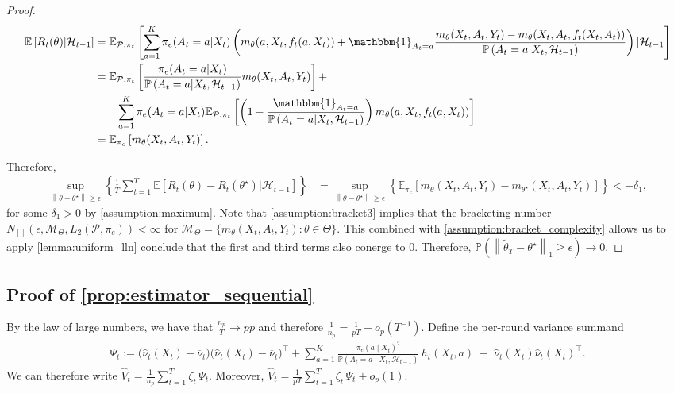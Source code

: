 \documentclass[11pt]{article}
\newcommand{\E}{\mathbb{E}}
\newcommand{\norm}[1]{\left\lVert#1\right\rVert}
\begin{document}
\begin{appendix}
\begin{proof}
\begin{align*}
    \E\left[R_{t}(\theta)| \mathcal{H}_{t-1} \right] &=  \E_{\mathcal{P},\pi_{t}}\left[\sum_{a=1}^{K} \pi_{e}(A_{t} =a | X_{t}) \left( m_{\theta}(a,X_{t},f_{t}(a,X_{t}))   + \mathbbm{1}_{A_{t} = a} \frac{ m_{\theta}(X_{t},A_{t},Y_{t})  -  m_{\theta}(X_{t},A_{t},f_{t}(X_{t},A_{t})) }{ \mathbb{P} \left(A_{t} =a | X_{t},\mathcal{H}_{t-1} \right)  }\right) |\mathcal{H}_{t-1}\right] \\
    &= \E_{\mathcal{P},\pi_{t}}\left[\frac{ \pi_{e}(A_{t} =a | X_{t})}{\mathbb{P} \left(A_{t} =a | X_{t},\mathcal{H}_{t-1} \right)} m_{\theta}(X_{t},A_{t},Y_{t}) \right ] + \\
    &\qquad \sum_{a =1}^{K}\pi_{e}(A_{t} =a | X_{t}) \E_{\mathcal{P},\pi_{t}} \left[ 
    \left( 1 - \frac{ \mathbbm{1}_{A_t=a}  }{  \mathbb{P} \left(A_{t}=a| X_{t}, \mathcal{H}_{t-1} \right)} \right)m_{\theta}(a,X_{t},f_{t}(a,X_{t}))  \right] \\
    &= \E_{\pi_{e} }\left[ m_{\theta}(X_{t},A_{t},Y_{t}) \right ]. 
\end{align*}

Therefore,
\begin{align*}
\sup_{\norm{\theta- \theta^{\star}} \ge \epsilon} \left\{ \frac{1}{T} \sum_{t=1}^{T} \mathbb{E}\left[ R_{t}(\theta) - R_{t}(\theta^{\star})| \mathcal{H}_{t-1} \right]  \right\} &= \sup_{\norm{\theta- \theta^{\star}} \ge \epsilon} \left\{\mathbb{E}_{\pi_{e}}\left[ m_{\theta}(X_{t},A_{t},Y_{t}) - m_{\theta^{\star}}(X_{t},A_{t},Y_{t})\right]  \right\} < - \delta_{1}, 
\end{align*}
for some $\delta_1 > 0$ by \cref{assumption:maximum}. Note that \cref{assumption:bracket3} implies that the bracketing number $N_{[]}(\epsilon, \mathcal{M}_{\Theta}, L_{2}(\mathcal{P},\pi_{e})) < \infty$ for $ \mathcal{M}_{\Theta} =  \{ m_{\theta}(X_t,A_{t},Y_{t}) : \theta \in \Theta  \}$. This combined with \cref{assumption:bracket_complexity} allows us to apply \cref{lemma:uniform_lln} conclude that the first and third terms also conerge to $0$. Therefore,  $\mathbb{P} \left( \norm{\tilde{\theta}_{T} - \theta^{\star}}_{1} \ge \epsilon \right) \rightarrow 0 $. 


    
\end{proof}
\subsection{Proof of \cref{prop:estimator_sequential}}
By the law of large numbers, we have that $\frac{n_p}{T} \rightarrow{p} p$ and therefore $\frac{1}{n_p} = \frac{1}{pT} + o_p(T^{-1})$. Define the per-round variance summand
\begin{align*}
\Psi_t:= 
\Big(\widehat{\nu}_t(X_t)-\overline{\nu}_t\Big)
\Big(\widehat{\nu}_t(X_t)-\overline{\nu}_t\Big)^\top + \sum_{a=1}^K
\frac{\pi_e(a\mid X_t)^2}{\mathbb P(A_t=a\mid X_t,\mathcal H_{t-1})}\,
h_t(X_t,a)
\;-\;
\widehat{\nu}_t(X_t)\widehat{\nu}_t(X_t)^\top.
\end{align*}
We can therefore write $\widehat V_t = \frac{1}{n_p}\sum_{t=1}^T \zeta_t\,\Psi_t$. Moreover, 
$\widehat V_t
=
\frac{1}{pT}\sum_{t=1}^T \zeta_t\,\Psi_t
+ o_p(1)$. 


\end{appendix}
\end{document}
